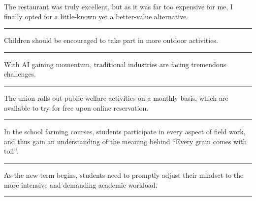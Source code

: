 \documentclass[11pt,a4paper]{article}
\newcommand{\num}[1]{\makebox[1.9em][r]{#1.}\hspace{0.3em}}
\newcommand{\wline}{\noindent\rule{\linewidth}{0.4pt}}
\begin{document}
\begin{minipage}{\linewidth}

\num{57}The restaurant was truly excellent, but as it was far too expensive for me, I finally opted for a little-known yet a better-value alternative.

\vspace{0.25em}

\wline

\end{minipage}

\vspace{0.35em}\vspace{0.15em}

\begin{minipage}{\linewidth}

\num{58}Children should be encouraged to take part in more outdoor activities.

\vspace{0.25em}

\wline

\end{minipage}

\begin{minipage}{\linewidth}

\num{59}With AI gaining momentum, traditional industries are facing tremendous challenges.

\vspace{0.25em}

\wline

\end{minipage}

\begin{minipage}{\linewidth}

\num{60}The union rolls out public welfare activities on a monthly basis, which are available to try for free upon online reservation.

\vspace{0.25em}

\wline

\end{minipage}

\begin{minipage}{\linewidth}

\num{61}In the school farming courses, students participate in every aspect of field work, and thus gain an understanding of the meaning behind “Every grain comes with toil”.

\vspace{0.25em}

\wline

\end{minipage}

\begin{minipage}{\linewidth}

\num{62}As the new term begins, students need to promptly adjust their mindset to the more intensive and demanding academic workload.

\vspace{0.25em}

\wline

\end{minipage}
\end{document}
